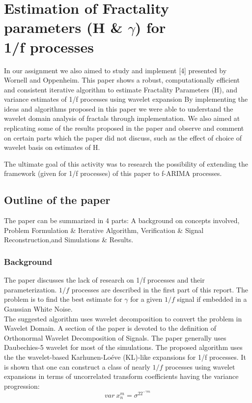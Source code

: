 \documentclass[a4paper]{article}
\begin{document}
\section{Estimation of Fractality parameters (H \& $\gamma$) for \\1/f processes}
In our assignment we also aimed to study and implement [4] presented by Wornell and Oppenheim. This paper shows a robust, computationally efficient and consistent iterative algorithm to estimate Fractality Parameters (H), ​and variance estimates of 1/f processes using wavelet expansion
By implementing the ideas and algorithms proposed in this paper we were able to understand the wavelet domain analysis of fractals through implementation. We also aimed at replicating some of the results proposed in the paper and observe and comment on certain parts which the paper did not discuss, such as the effect of choice of wavelet basis on estimates of H.

The ultimate goal of this activity was to research the possibility of extending the framework (given for 1/f processes) of this paper to f-ARIMA processes.

\subsection{Outline of the paper}

The paper can be summarized in 4 parts: A background on concepts involved, Problem Formulation \& Iterative Algorithm, Verification \& Signal Reconstruction,and Simulations \& Results.
\subsubsection{Background}
The paper discusses the lack of research on 1/f processes and their parameterization. $1/f$ processes are described in the first part of this report. The problem is to find the best estimate for $\gamma$ for a given $1/f$ signal if embedded in a Gaussian White Noise. \\
The suggested algorithm uses wavelet decomposition to convert the problem in Wavelet Domain. A section of the paper is devoted to the definition of Orthonormal Wavelet Decomposition of Signals. The paper generally uses Daubechies-5 wavelet for most of the simulations. The proposed algorithm uses the the wavelet-based Karhunen-Loéve (KL)-like expansions for 1/f processes. It is shown that one can construct a class of nearly $1 /f$ processes using wavelet expansions in terms of uncorrelated transform coefficients having the variance progression:
$$var\ x_n^m = \sigma^22^{-\gamma m}$$
\end{document}
